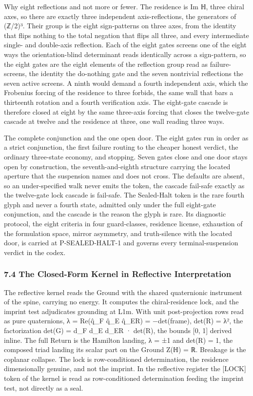 \documentclass[10pt,twocolumn]{article}
\begin{document}
Why eight reflections and not more or fewer. The residence is Im ℍ,
three chiral axes, so there are exactly three independent
axis-reflections, the generators of (ℤ/2)³. Their group is the eight
sign-patterns on three axes, from the identity that flips nothing to the
total negation that flips all three, and every intermediate single- and
double-axis reflection. Each of the eight gates screens one of the eight
ways the orientation-blind determinant reads identically across a
sign-pattern, so the eight gates are the eight elements of the
reflection group read as failure-screens, the identity the do-nothing
gate and the seven nontrivial reflections the seven active screens. A
ninth would demand a fourth independent axis, which the Frobenius
forcing of the residence to three forbids, the same wall that bars a
thirteenth rotation and a fourth verification axis. The eight-gate
cascade is therefore closed at eight by the same three-axis forcing that
closes the twelve-gate cascade at twelve and the residence at three, one
wall reading three ways.

The complete conjunction and the one open door. The eight gates run in
order as a strict conjunction, the first failure routing to the cheaper
honest verdict, the ordinary three-state economy, and stopping. Seven
gates close and one door stays open by construction, the
seventh-and-eighth structure carrying the located aperture that the
suspension names and does not cross. The defaults are absent, so an
under-specified walk never emits the token, the cascade fail-safe
exactly as the twelve-gate lock cascade is fail-safe. The Sealed-Halt
token is the rare fourth glyph and never a fourth state, admitted only
under the full eight-gate conjunction, and the cascade is the reason the
glyph is rare. Its diagnostic protocol, the eight criteria in four
guard-classes, residence license, exhaustion of the formulation space,
mirror asymmetry, and truth-silence with the located door, is carried at
P-SEALED-HALT-1 and governs every terminal-suspension verdict in the
codex.

\hypertarget{the-closed-form-kernel-in-reflective-interpretation}{%
\subsubsection{7.4 The Closed-Form Kernel in Reflective
Interpretation}\label{the-closed-form-kernel-in-reflective-interpretation}}

The reflective kernel reads the Ground with the shared quaternionic
instrument of the spine, carrying no energy. It computes the
chiral-residence lock, and the imprint test adjudicates grounding at
L1m. With unit post-projection rows read as pure quaternions, λ =
Re(q̂\_F q̂\_E q̂\_ER) = −det(frame), det(R) = λ², the factorization det(G)
= d\_F d\_E d\_ER · det(R), the bounds {[}0, 1{]} derived inline. The
full Return is the Hamilton landing, λ = ±1 and det(R) = 1, the composed
triad landing its scalar part on the Ground Z(ℍ) = ℝ. Breakage is the
coplanar collapse. The lock is row-conditioned determination, the
residence dimensionally genuine, and not the imprint. In the reflective
register the {[}LOCK{]} token of the kernel is read as row-conditioned
determination feeding the imprint test, not directly as a seal.
\end{document}
